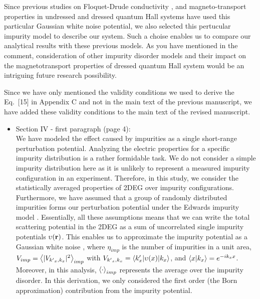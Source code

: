 \documentclass{article}
\begin{document}
Since previous studies on Floquet-Drude conductivity \cite{wackerl20}, and magneto-transport properties in undressed \cite{endo09} and dressed \cite{dini16} quantum Hall systems have used this particular Gaussian white noise potential, we also selected this pertucular impurity model to describe our system. Such a choise enables us to compare our analytical results with these previous models. As you have mentioned in the comment, consideration of other impurity disorder models and their impact on the magnetotransport properties of dressed quantum Hall system would be an intriguing future research possibility.

Since we have only mentioned the validity conditions we used to derive the Eq.~[15] in Appendix C and not in the main text of the previous manuscript, we have added these validity conditions to the main text of the revised manuscript.

\begin{itemize}
  \item Section IV - first paragraph (page 4):\\
  {\color{Red}
  We have modeled the effect caused by impurities as a single short-range perturbation potential. Analyzing the electric properties for a specific impurity distribution is a rather formidable task. We do not consider a simple impurity distribution here as it is unlikely to represent a measured impurity configuration in an experiment.
  Therefore, in this study, we consider the statistically averaged properties of 2DEG over impurity configurations.
  Furthermore, we have assumed that a group of randomly distributed impurities forms our perturbation potential under the Edwards impurity model  \cite{akkermans10,wackerl20}.
  Essentially, all these assumptions means that we can write the total scattering potential in the 2DEG as a sum of uncorrelated single impurity potentials $\upsilon(\vb{r})$. This enables us to approximate the impurity potential as a Gaussian white noise \cite{akkermans10,wackerl20},
  where $\eta_{imp}$ is the number of impurities in a unit area, $V_{imp} = \expval{|V_{{k'}_x,k_x}|^2}_{imp}$ with $V_{{k'}_x,k_x} = \mel**{k'_x}{\upsilon(x) }{k_x}$, and $\braket{x}{k_x} = e^{-ik_x x}$.
  Moreover, in this analysis, $\expval{\cdot}_{imp}$ represents the average over the impurity disorder. In this derivation, we only considered the first order (the Born approximation) contribution from the impurity potential.
  }
\end{itemize}
\end{document}
